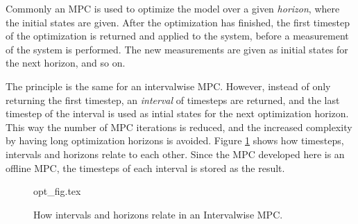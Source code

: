 Commonly an MPC is used to optimize the model over a given \textit{horizon}, where the initial states are given. After the optimization has finished, the first timestep of the optimization is returned and applied to the system, before a measurement of the system is performed. The new measurements are given as initial states for the next horizon, and so on.

The principle is the same for an intervalwise MPC. However, instead of only returning the first timestep, an \textit{interval} of timesteps are returned, and the last timestep of the interval is used as intial states for the next optimization horizon. This way the number of MPC iterations is reduced, and the increased complexity by having long optimization horizons is avoided. Figure \ref{fig:opt_fig} shows how timesteps, intervals and horizons relate to each other. Since the MPC developed here is an offline MPC, the timesteps of each interval is stored as the result.

\begin{figure}
	{opt_fig.tex}
	\caption{How intervals and horizons relate in an Intervalwise MPC.}
	\label{fig:opt_fig}
\end{figure}